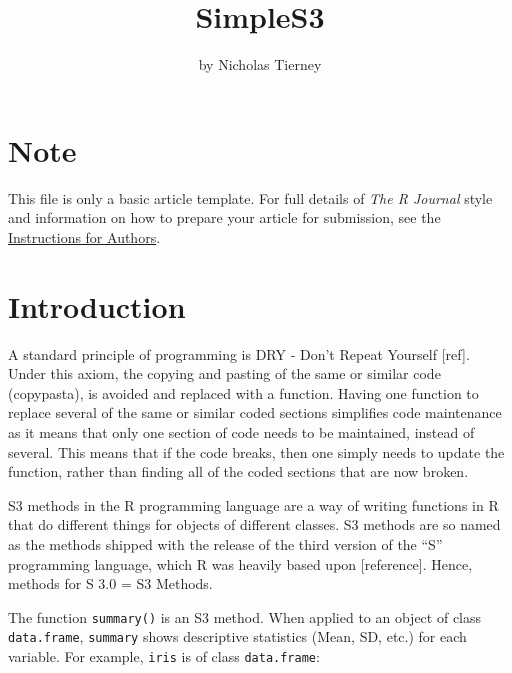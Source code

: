 \title{SimpleS3}
\author{by Nicholas Tierney}

\maketitle


\section{Note}\label{note}

This file is only a basic article template. For full details of
\emph{The R Journal} style and information on how to prepare your
article for submission, see the
\href{https://journal.r-project.org/share/author-guide.pdf}{Instructions
for Authors}.

\section{Introduction}\label{introduction}

A standard principle of programming is DRY - Don't Repeat Yourself
{[}ref{]}. Under this axiom, the copying and pasting of the same or
similar code (copypasta), is avoided and replaced with a function.
Having one function to replace several of the same or similar coded
sections simplifies code maintenance as it means that only one section
of code needs to be maintained, instead of several. This means that if
the code breaks, then one simply needs to update the function, rather
than finding all of the coded sections that are now broken.

S3 methods in the R programming language are a way of writing functions
in R that do different things for objects of different classes. S3
methods are so named as the methods shipped with the release of the
third version of the ``S'' programming language, which R was heavily
based upon {[}reference{]}. Hence, methods for S 3.0 = S3 Methods.

The function \texttt{summary()} is an S3 method. When applied to an
object of class \texttt{data.frame}, \texttt{summary} shows descriptive
statistics (Mean, SD, etc.) for each variable. For example,
\texttt{iris} is of class \texttt{data.frame}:

